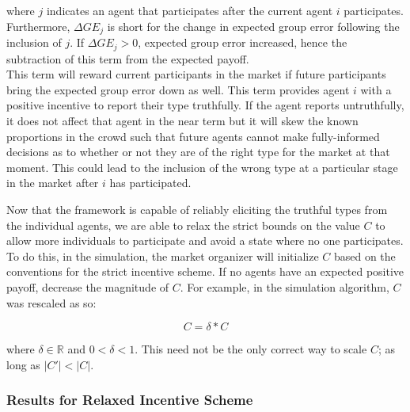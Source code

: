 \documentclass[twoside,twocolumn]{article}
\begin{document}
\\

\\
\newline

where $j$ indicates an agent that participates after the current agent $i$ participates. Furthermore, $\Delta GE_j$ is short for the change in expected group error following the inclusion of $j$. If $\Delta GE_j > 0$, expected group error increased, hence the subtraction of this term from the expected payoff.\\

This term will reward current participants in the market if future participants bring the expected group error down as well. This term provides agent $i$ with a positive incentive to report their type truthfully. If the agent reports untruthfully, it does not affect that agent in the near term but it will skew the known proportions in the crowd such that future agents cannot make fully-informed decisions as to whether or not they are of the right type for the market at that moment. This could lead to the inclusion of the wrong type at a particular stage in the market after $i$ has participated.

Now that the framework is capable of reliably eliciting the truthful types from the individual agents, we are able to relax the strict bounds on the value $C$ to allow more individuals to participate and avoid a state where no one participates. To do this, in the simulation, the market organizer will initialize $C$ based on the conventions for the strict incentive scheme. If no agents have an expected positive payoff, decrease the magnitude of $C$. For example, in the simulation algorithm, $C$ was rescaled as so:

\begin{equation}
\label{Cscale}
C = \delta * C
\end{equation}

where $\delta \in \mathbb{R}$ and $0 < \delta < 1$. This need not be the only correct way to scale $C$; as long as $|C'| < |C|$.

\subsubsection{Results for Relaxed Incentive Scheme}
\end{document}
